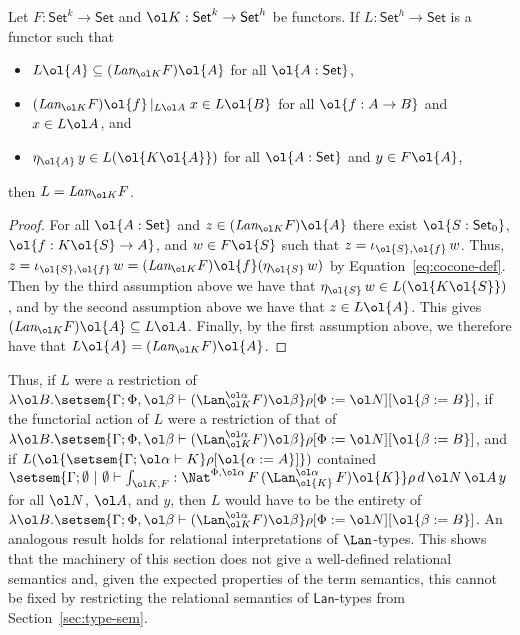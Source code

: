 \documentclass{lmcs}
\theoremstyle{plain}\newtheorem{satz}[thm]{Satz}
\newcommand{\set}{\mathsf{Set}}
\begin{document}
\begin{prop}\label{prop:full-lan}
Let $F : \set^k \to \set$ and $\ol K : \set^k \to \set^h$ be functors.
If $L : \set^h \to \set$ is a functor such that 
\begin{itemize}
\item $L \ol{A} \subseteq
  (\textit{Lan}_{\ol K} F)\ol{A}$ for all $\ol{A : \set}$,
\item $(\textit{Lan}_{\ol K} F)\ol{f}\,|_{L \ol A}\; x \in L
  \ol{B}$ for all $\ol{f : A \to B}$ and $x \in L \ol A$, and 
\item $\eta_{\ol{A}}\, y \in L ( \ol{K \ol{A}} )$ for all $\ol{A :
  \set}$ and $y \in F \ol{A}$, 
\end{itemize}
then $L = \textit{Lan}_{\ol K} F$.
\end{prop}
\begin{proof}
For all $\ol{A : \set}$ and $z \in (\textit{Lan}_{\ol K} F)\ol{A}$
there exist $\ol{S : \set_0}$, $\ol{f : K \ol{S} \to A}$, and $w \in F
\ol{S}$ such that $z = \iota_{\ol{S}, \ol{f}}\, w$.  Thus, $z =
\iota_{\ol{S}, \ol{f}}\, w = (\textit{Lan}_{\ol K} F) \ol{f}
(\eta_{\ol{S}} \,w)$ by Equation~\ref{eq:cocone-def}. Then by the
third assumption above we have that $\eta_{\ol{S}}\, w \in L (\ol{K
  \ol{S}})$, and by the second assumption above we have that $z \in L
\ol{A}$. This gives $(\textit{Lan}_{\ol K} F)\ol{A} \subseteq L \ol
A$. Finally, by the first assumption above, we therefore have that $L
\ol{A} = (\textit{Lan}_{\ol K} F)\ol{A}$.
\end{proof}
Thus, if $L$ were a restriction of $\lambda \ol B. \setsem{\Gamma; \Phi,\ol\beta
  \vdash (\Lan^{\ol\alpha}_{\ol K} F){\ol \beta}}\rho[\Phi := \ol
  N][\ol{\beta := B}]$,
if the functorial 
action of $L$ were a restriction of that of $\lambda \ol B. \setsem{\Gamma;
  \Phi,\ol\beta \vdash (\Lan^{\ol\alpha}_{\ol K} F){\ol
    \beta}}\rho[\Phi := \ol N][\ol{\beta := B}]$, and if
$L(\ol{\setsem{\Gamma;\ol\alpha \vdash K}\rho[\ol{\alpha := A}]})$ 
contained $\setsem{\Gamma;\emptyset~|~\emptyset \vdash \int_{\ol
    K,F} : \Nat^{\Phi, \ol\alpha}\, F\, (\Lan^{\ol\alpha}_{\ol{K}}\,
  F) \ol{K}}\rho\,d\,\ol N\,\ol A\,y$ for all $\ol N$, $\ol A$, and
$y$, then $L$ would have to be the entirety of
 $\lambda \ol B. \setsem{\Gamma; \Phi,\ol\beta
  \vdash (\Lan^{\ol\alpha}_{\ol K} F){\ol \beta}}\rho[\Phi := \ol
  N][\ol{\beta := B}]$.
An analogous result holds for relational interpretations of
$\Lan$-types. This shows that the machinery of this section does not
give a well-defined relational semantics and, given the expected
properties of the term semantics, this cannot be
fixed by restricting the relational semantics of $\mathsf{Lan}$-types
from Section~\ref{sec:type-sem}.
\end{document}
